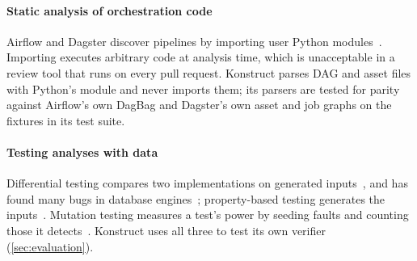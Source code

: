 \paragraph{Static analysis of orchestration code}
Airflow and Dagster discover pipelines by importing user Python modules~\citep{airflow,dagster}.
Importing executes arbitrary code at analysis time, which is unacceptable in a review tool that
runs on every pull request. Konstruct parses DAG and asset files with Python's  module and
never imports them; its parsers are tested for parity against Airflow's own DagBag and Dagster's
own asset and job graphs on the fixtures in its test suite.

\paragraph{Testing analyses with data}
Differential testing compares two implementations on generated inputs~\citep{mckeeman1998differential},
and has found many bugs in database engines~\citep{rigger2020pqs}; property-based testing generates
the inputs~\citep{maciver2019hypothesis}. Mutation testing measures a test's power by seeding
faults and counting those it detects~\citep{jia2011mutation}. Konstruct uses all three to test its
own verifier (\cref{sec:evaluation}).
